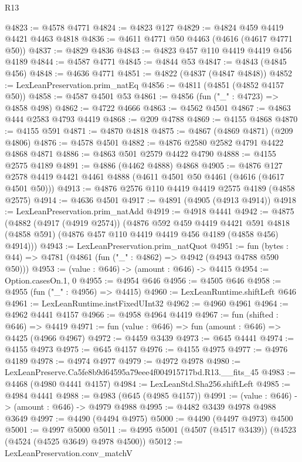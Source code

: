 \begin{lexlean}{R13}
\begin{coremodule}
@4823 := @4578 @4771
@4824 := @4823 @127
@4829 := @4824 @459 @4419 @4421 @4463 @4818
@4836 := @4611 @4771 @50 @4463 (@4616 (@4617 @4771 @50))
@4837 := @4829 @4836
@4843 := @4823 @457 @110 @4419 @4419 @456 @4189
@4844 := @4587 @4771
@4845 := @4844 @53
@4847 := @4843 (@4845 @456)
@4848 := @4636 @4771
@4851 := @4822 (@4837 (@4847 @4848))
@4852 := LexLeanPreservation.prim_natEq
@4856 := @4811 (@4851 (@4852 @4157 @50))
@4858 := @4587 @4501 @53
@4861 := @4856 (fun ("_" : @4723) => @4858 @498)
@4862 := @4722 @4666
@4863 := @4562 @4501
@4867 := @4863 @444 @2583 @4793 @4419
@4868 := @209 @4788
@4869 := @4155 @4868
@4870 := @4155 @591
@4871 := @4870 @4818
@4875 := @4867 (@4869 @4871) (@209 @4806)
@4876 := @4578 @4501
@4882 := @4876 @2580 @2582 @4791 @4422 @4868 @4871
@4886 := @4863 @501 @2579 @4422 @4790
@4888 := @4155 @2575 @4189
@4891 := @4886 (@4462 @4888) @4868
@4905 := @4876 @127 @2578 @4419 @4421 @4461 @4888 (@4611 @4501 @50 @4461 (@4616 (@4617 @4501 @50)))
@4913 := @4876 @2576 @110 @4419 @4419 @2575 @4189 (@4858 @2575)
@4914 := @4636 @4501
@4917 := @4891 (@4905 (@4913 @4914))
@4918 := LexLeanPreservation.prim_natAdd
@4919 := @4918 @4441
@4942 := @4875
    (@4882
      (@4917 (@4919 @2574))
      (@4876
        @592
        @459
        @4419
        @4421
        @591
        @4818
        (@4858 @591)
        (@4876 @457 @110 @4419 @4419 @456 @4189 (@4858 @456) @4914)))
@4943 := LexLeanPreservation.prim_natQuot
@4951 := fun (bytes : @44) => @4781 (@4861 (fun ("_" : @4862) => @4942 (@4943 @4788 @590 @50)))
@4953 := (value : @646) -> (amount : @646) -> @4415
@4954 := Option.casesOn.{1, 0}
@4955 := @4954 @646
@4956 := @4505 @646
@4958 := @4955 (fun ("_" : @4956) => @4415)
@4960 := LexLeanRuntime.shiftLeft @646
@4961 := LexLeanRuntime.instFixedUInt32
@4962 := @4960 @4961
@4964 := @4962 @4441 @4157
@4966 := @4958 @4964 @4419
@4967 := fun (shifted : @646) => @4419
@4971 := fun (value : @646) => fun (amount : @646) => @4425 (@4966 @4967)
@4972 := @4459 @3439
@4973 := @645 @4441
@4974 := @4155 @4973
@4975 := @645 @4157
@4976 := @4155 @4975
@4977 := @4976 @4189
@4978 := @4974 @4977
@4979 := @4972 @4978
@4980 := LexLeanPreserve.Ca5fe8b9d64595a79eee4f004915717bd.R13.__fits_45
@4983 := @4468 (@4980 @4441 @4157)
@4984 := LexLeanStd.Sha256.shiftLeft
@4985 := @4984 @4441
@4988 := @4983 (@645 (@4985 @4157))
@4991 := (value : @646) -> (amount : @646) -> @4979 @4988
@4995 := @4482 @3439 @4978 @4988 @3649
@4997 := @4490 (@4494 @4975)
@5000 := @4490 (@4497 @4973) @4500
@5001 := @4997 @5000
@5011 := @4995 @5001 (@4507 (@4517 @3439)) (@4523 (@4524 (@4525 @3649) @4978 @4500))
@5012 := LexLeanPreservation.conv_matchV

\end{coremodule}
\end{lexlean}
